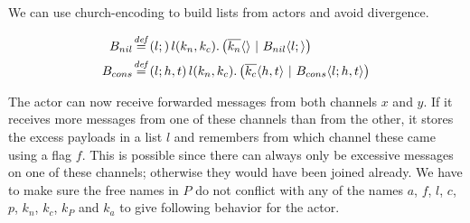 We can use church-encoding to build lists from actors and avoid divergence.


\begin{align*}
  \adef*{B_{nil}}{l}{}{\arcv{l}{k_n,k_c} . \parens{\asnd{k_n}{} \apar \ains{B_{nil}}{l}{}}}
  \\
  \adef*{B_{cons}}{l}{h,t}{\arcv{l}{k_n,k_c} . \parens{\asnd{k_c}{h,t} \apar \ains{B_{cons}}{l}{h,t}}}
\end{align*}

The actor can now receive forwarded messages from both channels $x$ and $y$.
If it receives more messages from one of these channels than from the other,
it stores the excess payloads in a list $l$ and remembers from which channel
these came using a flag $f$.
This is possible since there can always only be excessive messages on one of these channels;
otherwise they would have been joined already.
We have to make sure the free names in $P$ do not conflict with any of the names
$a$, $f$, $l$, $c$, $p$, $k_n$, $k_c$, $k_P$ and $k_a$
to give following behavior for the actor.

